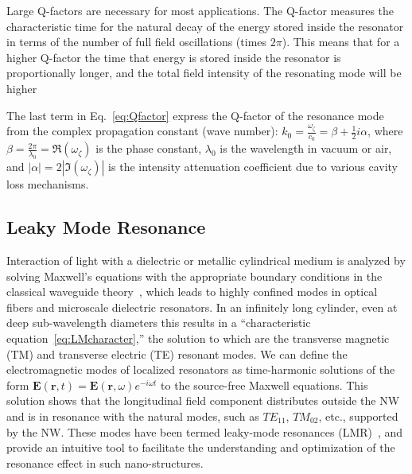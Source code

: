 Large Q-factors are necessary for most applications. The Q-factor measures the
characteristic time for the natural decay of the energy stored inside the
resonator in terms of the number of full field oscillations (times $2\pi$).
This means that for a higher Q-factor the time that energy is stored inside the
resonator is proportionally longer, and the total field intensity of the
resonating mode will be higher 

The last term in Eq.~\ref{eq:Qfactor} express the Q-factor of the resonance
mode from the complex propagation constant (wave number):
$k_0=\frac{\omega_\zeta}{c_0}=\beta+\frac{1}{2}i\alpha$, where
$\beta=\frac{2\pi}{\lambda_0}=\Re(\omega_\zeta)$ is the phase constant,
$\lambda_0$ is the wavelength in vacuum or air, and
$|\alpha|=2|\Im(\omega_\zeta)|$ is the intensity attenuation coefficient due to
various cavity loss mechanisms.

\subsection{Leaky Mode Resonance}
\label{sec:LMR}

Interaction of light with a dielectric or metallic cylindrical medium is
analyzed by solving Maxwell's equations with the appropriate boundary
conditions in the classical waveguide theory~\cite{Kapany2012optical}, which
leads to highly confined modes in optical fibers and microscale dielectric
resonators.  In an infinitely long cylinder, even at deep sub-wavelength
diameters this results in a “characteristic equation~\ref{eq:LMcharacter},” the
solution to which are the transverse magnetic (TM) and transverse electric (TE)
resonant modes. We can define the electromagnetic modes of localized resonators
as time-harmonic solutions of the form $\bm{E}(\bm{r},t) =
\bm{E}(\bm{r},\omega)e^{-i\omega{t}}$ to the source-free Maxwell equations.
This solution shows that the longitudinal field component distributes outside
the NW and is in resonance with the natural modes, such as ${TE}_{11}$,
${TM}_{02}$, etc., supported by the NW.  These modes have been termed
leaky-mode resonances (LMR)~\cite{Cao:2009ho,Fountaine:2014de}, and provide an
intuitive tool to facilitate the understanding and optimization of the
resonance effect in such nano-structures.

